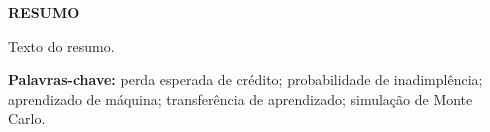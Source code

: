 \clearpage
{\centering\bfseries RESUMO\par}\vspace{\baselineskip}

\noindent Texto do resumo.

\vspace{\baselineskip}
\noindent\textbf{Palavras-chave:} perda esperada de crédito; probabilidade de
inadimplência; aprendizado de máquina; transferência de aprendizado; simulação de
Monte Carlo.
